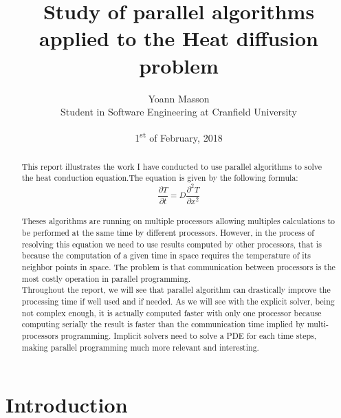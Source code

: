 \documentclass[12pt, a4paper]{report}
\title{Study of parallel algorithms applied to the Heat diffusion problem}
\author{Yoann Masson \\ Student in Software Engineering at Cranfield University}
\date{1\textsuperscript{st} of February, 2018}
\begin{document}
\begin{titlepage}
\maketitle
\end{titlepage}


\begin{abstract}
This report illustrates the work I have conducted to use parallel algorithms to solve the heat conduction equation.The equation is given by the following formula:\begin{equation}\frac{\partial T}{\partial t} = D\frac{\partial^2T }{\partial x^2}
\end{equation} 
\\Theses algorithms are running on multiple processors allowing multiples calculations to be performed at the same time by different processors. However, in the process of resolving this equation we need to use results computed by other processors, that is because the computation of a given time in space requires the temperature of its neighbor points in space. The problem is that communication between processors is the most costly operation in parallel programming.\\ Throughout the report, we will see that parallel algorithm can drastically improve the processing time if well used and if needed. As we will see with the explicit solver, being not complex enough, it is actually computed faster with only one processor because computing serially the result is faster than the communication time implied by multi-processors programming. Implicit solvers need to solve a PDE for each time steps, making parallel programming much more relevant and interesting.



\end{abstract}


\tableofcontents

\chapter*{Introduction}
\end{document}
